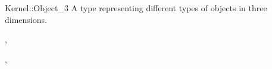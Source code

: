 \begin{ccRefConcept}{Kernel::Object_3}
A type representing different types of objects in three dimensions.

\ccRefines
{},

\ccSeeAlso
{}, 

\end{ccRefConcept}
